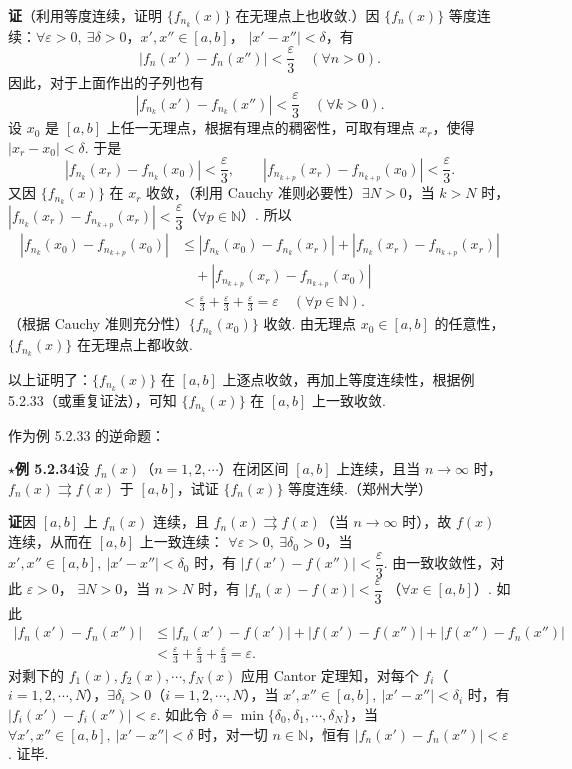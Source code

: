 \documentclass[UTF8, 12pt, fontset=fandol, oneside]{ctexart}
\begin{document}
\noindent\textbf{证}\quad （利用等度连续，证明 $\{f_{n_k}(x)\}$ 在无理点上也收敛.）因
$\{f_n(x)\}$ 等度连续：$\forall\varepsilon>0,\ \exists\delta>0$，$x',x''\in[a,b]$，
$|x'-x''|<\delta$，有
\[
  |f_n(x')-f_n(x'')|<\frac\varepsilon3\quad(\forall n>0).
\]
因此，对于上面作出的子列也有
\[
  |f_{n_k}(x')-f_{n_k}(x'')|<\frac\varepsilon3\quad(\forall k>0).
\]
设 $x_0$ 是 $[a,b]$ 上任一无理点，根据有理点的稠密性，可取有理点 $x_r$，使得
$|x_r-x_0|<\delta$. 于是
\[
  |f_{n_k}(x_r)-f_{n_k}(x_0)|<\frac\varepsilon3,\qquad
  |f_{n_{k+p}}(x_r)-f_{n_{k+p}}(x_0)|<\frac\varepsilon3.
\]
又因 $\{f_{n_k}(x)\}$ 在 $x_r$ 收敛，（利用 Cauchy 准则必要性）$\exists N>0$，当
$k>N$ 时，$|f_{n_k}(x_r)-f_{n_{k+p}}(x_r)|<\dfrac\varepsilon3$（$\forall p\in\mathbb N$）. 所以
\[
\begin{aligned}
  |f_{n_k}(x_0)-f_{n_{k+p}}(x_0)|
  &\le |f_{n_k}(x_0)-f_{n_k}(x_r)|
    +|f_{n_k}(x_r)-f_{n_{k+p}}(x_r)|\\
  &\quad +|f_{n_{k+p}}(x_r)-f_{n_{k+p}}(x_0)|\\
  &<\frac\varepsilon3+\frac\varepsilon3+\frac\varepsilon3=\varepsilon\quad(\forall p\in\mathbb N).
\end{aligned}
\]
（根据 Cauchy 准则充分性）$\{f_{n_k}(x_0)\}$ 收敛. 由无理点 $x_0\in[a,b]$ 的任意性，
$\{f_{n_k}(x)\}$ 在无理点上都收敛.

以上证明了：$\{f_{n_k}(x)\}$ 在 $[a,b]$ 上逐点收敛，再加上等度连续性，根据例 5.2.33（或重复证法），可知
$\{f_{n_k}(x)\}$ 在 $[a,b]$ 上一致收敛.

作为例 5.2.33 的逆命题：

\noindent\textbf{$\star$例 5.2.34}\quad 设 $f_n(x)$（$n=1,2,\cdots$）在闭区间 $[a,b]$ 上连续，且当
$n\to\infty$ 时，$f_n(x)\rightrightarrows f(x)$ 于 $[a,b]$，试证 $\{f_n(x)\}$ 等度连续.（郑州大学）

\noindent\textbf{证}\quad 因 $[a,b]$ 上 $f_n(x)$ 连续，且 $f_n(x)\rightrightarrows f(x)$（当
$n\to\infty$ 时），故 $f(x)$ 连续，从而在 $[a,b]$ 上一致连续：
$\forall\varepsilon>0,\ \exists\delta_0>0$，当
$x',x''\in[a,b],\ |x'-x''|<\delta_0$ 时，有
$|f(x')-f(x'')|<\dfrac\varepsilon3$. 由一致收敛性，对此 $\varepsilon>0$，
$\exists N>0$，当 $n>N$ 时，有 $|f_n(x)-f(x)|<\dfrac\varepsilon3$
（$\forall x\in[a,b]$）. 如此
\[
\begin{aligned}
  |f_n(x')-f_n(x'')|
  &\le |f_n(x')-f(x')|+|f(x')-f(x'')|+|f(x'')-f_n(x'')|\\
  &<\frac\varepsilon3+\frac\varepsilon3+\frac\varepsilon3=\varepsilon.
\end{aligned}
\]
对剩下的 $f_1(x),f_2(x),\cdots,f_N(x)$ 应用 Cantor 定理知，对每个
$f_i$（$i=1,2,\cdots,N$），$\exists\delta_i>0$（$i=1,2,\cdots,N$），当
$x',x''\in[a,b],\ |x'-x''|<\delta_i$ 时，有 $|f_i(x')-f_i(x'')|<\varepsilon$. 如此令
$\delta=\min\{\delta_0,\delta_1,\cdots,\delta_N\}$，当
$\forall x',x''\in[a,b],\ |x'-x''|<\delta$ 时，对一切 $n\in\mathbb N$，恒有
$|f_n(x')-f_n(x'')|<\varepsilon$. 证毕.
\end{document}

